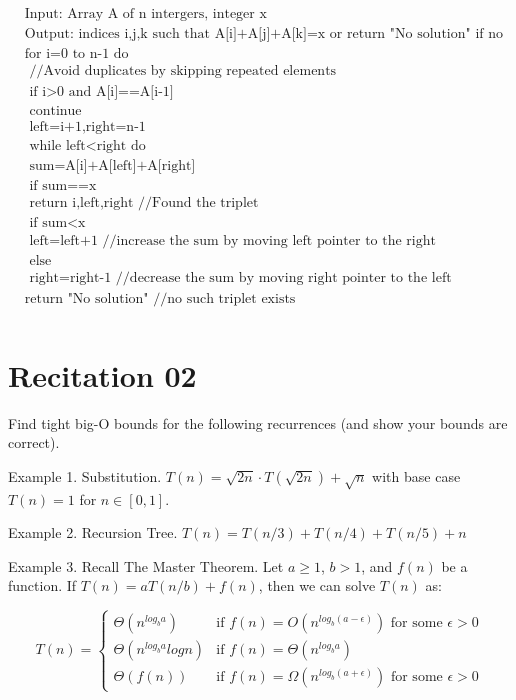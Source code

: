 \begin{enumerate}
\begin{align*}
        &\text{Input: Array A of n intergers, integer x}\\
        &\text{Output: indices i,j,k such that A[i]+A[j]+A[k]=x or return "No solution" if no such triplet exists}\\
        &\text{for i=0 to n-1 do}\\
        &\text{    //Avoid duplicates by skipping repeated elements}\\
        &\text{    if i>0 and A[i]==A[i-1]}\\
        &\text{        continue}\\
        &\text{    left=i+1,right=n-1}\\
        &\text{    while left<right do}\\
        &\text{        sum=A[i]+A[left]+A[right]}\\
        &\text{        if sum==x}\\
        &\text{            return i,left,right //Found the triplet}\\
        &\text{        if sum<x}\\
        &\text{            left=left+1 //increase the sum by moving left pointer to the right}\\
        &\text{        else}\\
        &\text{            right=right-1 //decrease the sum by moving right pointer to the left}\\
        &\text{return "No solution" //no such triplet exists}\\
    \end{align*}
\end{enumerate}
\section{Recitation 02}

Find tight big-O bounds for the following recurrences (and show your bounds are correct).

Example 1. Substitution. $T(n) = \sqrt{2n} \cdot T(\sqrt{2n}) + \sqrt{n}$ with base case $T(n) = 1$ for $n \in [0,1]$.

Example 2. Recursion Tree. $T(n) = T(n/3) + T(n/4) + T(n/5) + n$

Example 3. Recall The Master Theorem. Let $a \geq 1$, $b > 1$, and $f(n)$ be a function. If $T(n) = aT(n/b) + f(n)$, then we can solve $T(n)$ as:

$$T(n) = \left\{
\begin{array}{ll}
\Theta(n^{log_b a}) & \text{if } f(n) = O(n^{log_b(a-\epsilon)}) \text{ for some } \epsilon > 0 \\
\Theta(n^{log_b a} log n) & \text{if } f(n) = \Theta(n^{log_b a}) \\
\Theta(f(n)) & \text{if } f(n) = \Omega(n^{log_b(a+\epsilon)}) \text{ for some } \epsilon > 0
\end{array}
\right.$$

